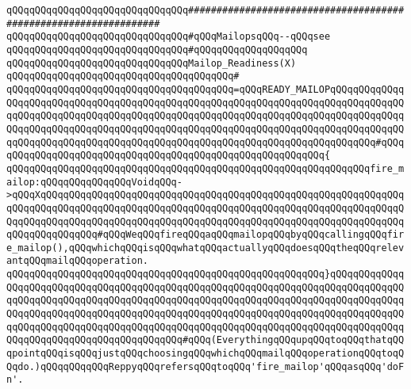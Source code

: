 \newline
\newline
\newline
\verb|qQQqqQQqqQQqqQQqqQQqqQQqqQQqqQQq#################################################################|\newline
\verb|qQQqqQQqqQQqqQQqqQQqqQQqqQQqqQQq#qQQqMailopsqQQq--qQQqsee|\newline
\verb|qQQqqQQqqQQqqQQqqQQqqQQqqQQqqQQq#qQQqqQQqqQQqqQQqqQQq|\newline
\newline
\newline
\verb|qQQqqQQqqQQqqQQqqQQqqQQqqQQqqQQqMailop_Readiness(X)|\newline
\verb|qQQqqQQqqQQqqQQqqQQqqQQqqQQqqQQqqQQqqQQq#|\newline
\verb|qQQqqQQqqQQqqQQqqQQqqQQqqQQqqQQqqQQqqQQq=qQQqREADY_MAILOPqQQqqQQqqQQqqQQqqQQqqQQqqQQqqQQqqQQqqQQqqQQqqQQqqQQqqQQqqQQqqQQqqQQqqQQqqQQqqQQqqQQqqQQqqQQqqQQqqQQqqQQqqQQqqQQqqQQqqQQqqQQqqQQqqQQqqQQqqQQqqQQqqQQqqQQqqQQqqQQqqQQqqQQqqQQqqQQqqQQqqQQqqQQqqQQqqQQqqQQqqQQqqQQqqQQqqQQqqQQqqQQqqQQqqQQqqQQqqQQqqQQqqQQqqQQqqQQqqQQqqQQqqQQqqQQqqQQqqQQqqQQqqQQq#qQQq|\newline
\verb|qQQqqQQqqQQqqQQqqQQqqQQqqQQqqQQqqQQqqQQqqQQqqQQqqQQqqQQq{|\newline
\verb|qQQqqQQqqQQqqQQqqQQqqQQqqQQqqQQqqQQqqQQqqQQqqQQqqQQqqQQqqQQqqQQqfire_mailop:qQQqqQQqqQQqqQQqVoidqQQq->qQQqXqQQqqQQqqQQqqQQqqQQqqQQqqQQqqQQqqQQqqQQqqQQqqQQqqQQqqQQqqQQqqQQqqQQqqQQqqQQqqQQqqQQqqQQqqQQqqQQqqQQqqQQqqQQqqQQqqQQqqQQqqQQqqQQqqQQqqQQqqQQqqQQqqQQqqQQqqQQqqQQqqQQqqQQqqQQqqQQqqQQqqQQqqQQqqQQqqQQqqQQqqQQqqQQqqQQqqQQqqQQq#qQQqWeqQQqfireqQQqaqQQqmailopqQQqbyqQQqcallingqQQqfire_mailop(),qQQqwhichqQQqisqQQqwhatqQQqactuallyqQQqdoesqQQqtheqQQqrelevantqQQqmailqQQqoperation.|\newline
\verb|qQQqqQQqqQQqqQQqqQQqqQQqqQQqqQQqqQQqqQQqqQQqqQQqqQQqqQQq}qQQqqQQqqQQqqQQqqQQqqQQqqQQqqQQqqQQqqQQqqQQqqQQqqQQqqQQqqQQqqQQqqQQqqQQqqQQqqQQqqQQqqQQqqQQqqQQqqQQqqQQqqQQqqQQqqQQqqQQqqQQqqQQqqQQqqQQqqQQqqQQqqQQqqQQqqQQqqQQqqQQqqQQqqQQqqQQqqQQqqQQqqQQqqQQqqQQqqQQqqQQqqQQqqQQqqQQqqQQqqQQqqQQqqQQqqQQqqQQqqQQqqQQqqQQqqQQqqQQqqQQqqQQqqQQqqQQqqQQqqQQqqQQqqQQqqQQqqQQqqQQqqQQqqQQqqQQqqQQqqQQq#qQQq(EverythingqQQqupqQQqtoqQQqthatqQQqpointqQQqisqQQqjustqQQqchoosingqQQqwhichqQQqmailqQQqoperationqQQqtoqQQqdo.)qQQqqQQqqQQqReppyqQQqrefersqQQqtoqQQq'fire_mailop'qQQqasqQQq'doFn'.|\newline
